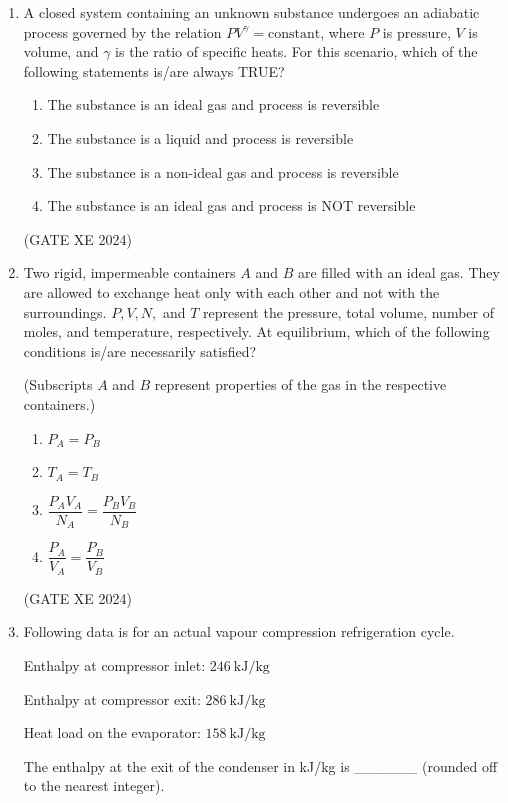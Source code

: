 \documentclass[12pt]{article}
\begin{document}
\begin{enumerate}
(GATE XE 2024)

\item A closed system containing an unknown substance undergoes an adiabatic process governed by the relation $PV^{\gamma} = \text{constant}$, where $P$ is pressure, $V$ is volume, and $\gamma$ is the ratio of specific heats. For this scenario, which of the following statements is/are always TRUE?

\begin{enumerate}
\item The substance is an ideal gas and process is reversible  
\item The substance is a liquid and process is reversible  
\item The substance is a non-ideal gas and process is reversible  
\item The substance is an ideal gas and process is NOT reversible  
\end{enumerate}

(GATE XE 2024)

\item Two rigid, impermeable containers $A$ and $B$ are filled with an ideal gas. They are allowed to exchange heat only with each other and not with the surroundings. $P, V, N,$ and $T$ represent the pressure, total volume, number of moles, and temperature, respectively. At equilibrium, which of the following conditions is/are necessarily satisfied?

(Subscripts $A$ and $B$ represent properties of the gas in the respective containers.)

\begin{enumerate}
\item $P_A = P_B$
\item $T_A = T_B$
\item $\dfrac{P_A V_A}{N_A} = \dfrac{P_B V_B}{N_B}$
\item $\dfrac{P_A}{V_A} = \dfrac{P_B}{V_B}$
\end{enumerate}

(GATE XE 2024)

\item Following data is for an actual vapour compression refrigeration cycle.  

Enthalpy at compressor inlet: $246 \ \text{kJ/kg}$  

Enthalpy at compressor exit: $286 \ \text{kJ/kg}$  

Heat load on the evaporator: $158 \ \text{kJ/kg}$  

The enthalpy at the exit of the condenser in kJ/kg is \_\_\_\_\_\_ (rounded off to the nearest integer).  


\end{enumerate}
\end{document}
